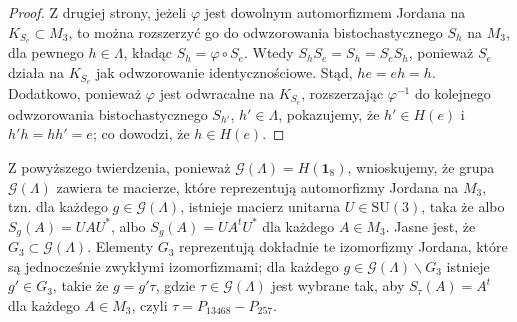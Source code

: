{\begin{proof}
Z drugiej strony, jeżeli $\varphi$ jest dowolnym automorfizmem Jordana na
$K_{S_{e}} \subset M_{3}$,
to można rozszerzyć go do odwzorowania bistochastycznego $S_{h}$ na $M_{3}$,
dla pewnego $h \in \Lambda$,
kładąc $S_{h} = \varphi \circ S_{e}$.
Wtedy
    $S_{h} S_{e} = S_{h} = S_{e} S_{h}$,
ponieważ $S_{e}$ działa na $K_{S_{e}}$ jak odwzorowanie identycznościowe.
Stąd, $he = eh = h$.
Dodatkowo, ponieważ $\varphi$ jest odwracalne na $K_{S_{e}}$,
rozszerzając $\varphi^{-1}$ do kolejnego odwzorowania bistochastycznego
    $S_{h'}$,  $h' \in \Lambda$,
pokazujemy, że $h' \in H(e)$ i $h' h = h h' = e$;
co dowodzi, że $h \in H(e)$.
\end{proof}
\begin{Remark}
Z powyższego twierdzenia, ponieważ $\mathcal{G}(\Lambda) = H(\mathbf{1}_{8})$,
wnioskujemy, że grupa $\mathcal{G}(\Lambda)$ zawiera te macierze,
które reprezentują automorfizmy Jordana na $M_{3}$,
tzn. dla każdego $g \in \mathcal{G}(\Lambda)$,
istnieje macierz unitarna $U \in \text{SU}(3)$, taka że
albo $S_{g}(A) = U A U^{*}$, albo $S_{g}(A) = U A^{t} U^{*}$
dla każdego $A \in M_{3}$.
Jasne jest, że $G_{3} \subset \mathcal{G}(\Lambda)$.
Elementy $G_{3}$ reprezentują dokładnie te izomorfizmy Jordana,
które są jednocześnie zwykłymi izomorfizmami;
dla każdego $g \in \mathcal{G}(\Lambda) \backslash G_{3}$ istnieje
$g' \in G_{3}$, takie że $g = g' \tau$,
gdzie $\tau \in \mathcal{G}(\Lambda)$ jest wybrane tak, aby
$S_{\tau}(A) = A^{t}$ dla każdego $A \in M_{3}$,
czyli
$\tau = P_{13468} - P_{257}$.
\end{Remark}

}
